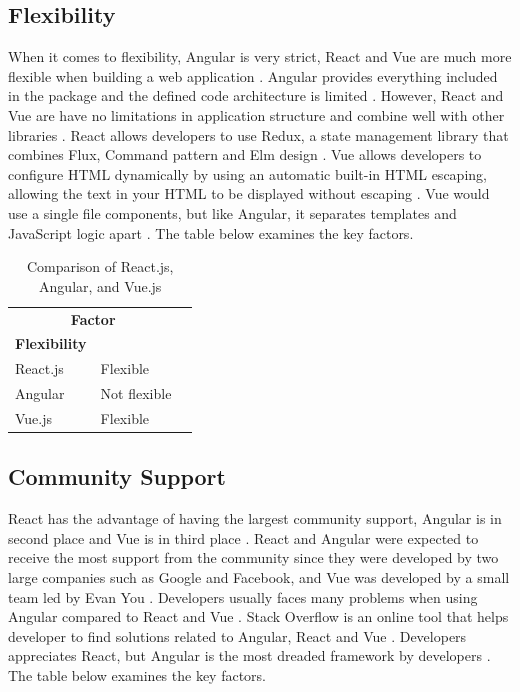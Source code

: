 \documentclass[10pt,journal,compsoc]{IEEEtran}
\begin{document}
\subsection{Flexibility}
When it comes to flexibility, Angular is very strict, React and Vue are much more flexible when building a web application \cite{cincovic2020comparison}. Angular provides everything included in the package and the defined code architecture is limited \cite{cincovic2020comparison}. However, React and Vue are have no limitations in application structure and combine well with other libraries \cite{cincovic2020comparison}. React allows developers to use Redux, a state management library that combines Flux, Command pattern and Elm design \cite{chen2019front}. Vue allows developers to configure HTML dynamically by using an automatic built-in HTML escaping, allowing the text in your HTML to be displayed without escaping \cite{macrae2018vue}. Vue would use a single file components, but like Angular, it separates templates and JavaScript logic apart \cite{vyas2022comparative}. The table below examines the key factors.

\begin{table}[ht]
    \centering
    \begin{tabular}{llr}
        \hline
        \multicolumn{2}{c}{\textbf{Factor}} \\
        \cline{1-2}
        \textbf{Flexibility} & \\
        React.js & Flexible \cite{cincovic2020comparison}\\
        Angular & Not flexible \cite{cincovic2020comparison}\\
        Vue.js & Flexible \cite{cincovic2020comparison}\\
        \hline
    \end{tabular}
    \caption{Comparison of React.js, Angular, and Vue.js}
    \label{tab:comparison}
\end{table}

\subsection{Community Support}
React has the advantage of having the largest community support, Angular is in second place and Vue is in third place \cite{cincovic2020comparison}. React and Angular were expected to receive the most support from the community since they were developed by two large companies such as Google and Facebook, and Vue was developed by a small team led by Evan You \cite{cincovic2020comparison}. Developers usually faces many problems when using Angular compared to React and Vue \cite{wohlgethan2018supportingweb}. Stack Overflow is an online tool that helps developer to find solutions related to Angular, React and Vue \cite{dinku2022react}. Developers appreciates React, but Angular is the most dreaded framework by developers \cite{wohlgethan2018supportingweb}. The table below examines the key factors.
\end{document}
